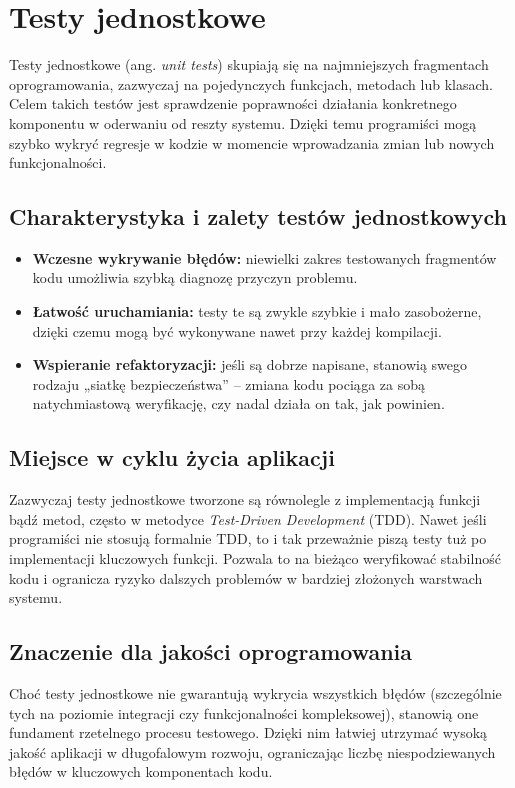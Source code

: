 \documentclass[12pt]{report}
\begin{document}
\section{Testy jednostkowe}
\label{sec:testy-jednostkowe}
Testy jednostkowe (ang. \emph{unit tests}) skupiają się na najmniejszych fragmentach oprogramowania, zazwyczaj na pojedynczych funkcjach, metodach lub klasach. Celem takich testów jest sprawdzenie poprawności działania konkretnego komponentu w oderwaniu od reszty systemu. Dzięki temu programiści mogą szybko wykryć regresje w kodzie w momencie wprowadzania zmian lub nowych funkcjonalności.

\subsection*{Charakterystyka i zalety testów jednostkowych}
\begin{itemize}
    \item \textbf{Wczesne wykrywanie błędów:} niewielki zakres testowanych fragmentów kodu umożliwia szybką diagnozę przyczyn problemu.
    \item \textbf{Łatwość uruchamiania:} testy te są zwykle szybkie i mało zasobożerne, dzięki czemu mogą być wykonywane nawet przy każdej kompilacji.
    \item \textbf{Wspieranie refaktoryzacji:} jeśli są dobrze napisane, stanowią swego rodzaju „siatkę bezpieczeństwa” – zmiana kodu pociąga za sobą natychmiastową weryfikację, czy nadal działa on tak, jak powinien.
\end{itemize}

\subsection*{Miejsce w cyklu życia aplikacji}
Zazwyczaj testy jednostkowe tworzone są równolegle z implementacją funkcji bądź metod, często w metodyce \emph{Test-Driven Development} (TDD). Nawet jeśli programiści nie stosują formalnie TDD, to i tak przeważnie piszą testy tuż po implementacji kluczowych funkcji. Pozwala to na bieżąco weryfikować stabilność kodu i ogranicza ryzyko dalszych problemów w bardziej złożonych warstwach systemu.

\subsection*{Znaczenie dla jakości oprogramowania}
Choć testy jednostkowe nie gwarantują wykrycia wszystkich błędów (szczególnie tych na poziomie integracji czy funkcjonalności kompleksowej), stanowią one fundament rzetelnego procesu testowego. Dzięki nim łatwiej utrzymać wysoką jakość aplikacji w długofalowym rozwoju, ograniczając liczbę niespodziewanych błędów w kluczowych komponentach kodu.
\end{document}
